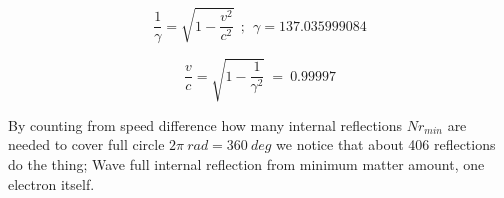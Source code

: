 \begin{equation} \label{eq:clock_rate} %
 \frac{1}{\gamma}=\sqrt{1-\frac{v^2}{c^2}}~~;~~\gamma=137.035999084
\end{equation}




\begin{equation} \label{eq:speed}
	\frac{v}{c}=\sqrt{1-\frac{1}{\gamma^2}} ~=~ 0.99997
\end{equation}






By counting from speed difference how many internal reflections $Nr_{min}$
are needed to cover full circle $2\pi~rad = 360~deg$ we notice that about
406 reflections do the thing; Wave full internal reflection from minimum
matter amount, one electron itself.


